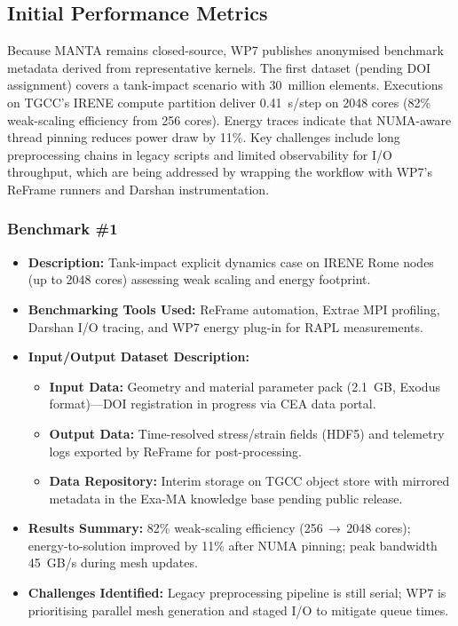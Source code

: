 \subsection{Initial Performance Metrics}
\label{sec:WP7:MANTA:metrics}

Because MANTA remains closed-source, WP7 publishes anonymised benchmark metadata derived from representative kernels. The first
dataset (pending DOI assignment) covers a tank-impact scenario with 30~million elements. Executions on TGCC's IRENE compute
partition deliver 0.41~s/step on 2048 cores (82\% weak-scaling efficiency from 256 cores). Energy traces indicate that NUMA-aware
thread pinning reduces power draw by 11\%. Key challenges include long preprocessing chains in legacy scripts and limited
observability for I/O throughput, which are being addressed by wrapping the workflow with WP7's ReFrame runners and Darshan
instrumentation.

\subsubsection{Benchmark \#1}
\begin{itemize}
    \item \textbf{Description:} Tank-impact explicit dynamics case on IRENE Rome nodes (up to 2048 cores) assessing weak scaling and energy footprint.
    \item \textbf{Benchmarking Tools Used:} ReFrame automation, Extrae MPI profiling, Darshan I/O tracing, and WP7 energy plug-in for RAPL measurements.
    \item \textbf{Input/Output Dataset Description:}
        \begin{itemize}
            \item \textbf{Input Data:} Geometry and material parameter pack (2.1~GB, Exodus format)---DOI registration in progress via CEA data portal.
            \item \textbf{Output Data:} Time-resolved stress/strain fields (HDF5) and telemetry logs exported by ReFrame for post-processing.
            \item \textbf{Data Repository:} Interim storage on TGCC object store with mirrored metadata in the Exa-MA knowledge base pending public release.
        \end{itemize}
    \item \textbf{Results Summary:} 82\% weak-scaling efficiency (256\,$\rightarrow$\,2048 cores); energy-to-solution improved by 11\% after NUMA pinning; peak bandwidth 45~GB/s during mesh updates.
    \item \textbf{Challenges Identified:} Legacy preprocessing pipeline is still serial; WP7 is prioritising parallel mesh generation and staged I/O to mitigate queue times.
\end{itemize}


